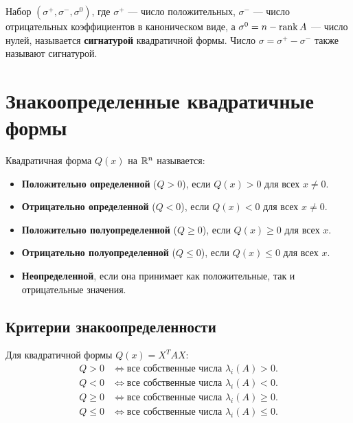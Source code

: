 \documentclass[12pt]{article}
\begin{document}
\begin{definition}
Набор $(\sigma^+, \sigma^-, \sigma^0)$, где $\sigma^+$ --- число положительных, $\sigma^-$ --- число отрицательных коэффициентов в каноническом виде, а $\sigma^0 = n - \operatorname{rank} A$ --- число нулей, называется \textbf{сигнатурой} квадратичной формы. Число $\sigma = \sigma^+ - \sigma^-$ также называют сигнатурой.
\end{definition}

\section{Знакоопределенные квадратичные формы}

\begin{definition}
Квадратичная форма $Q(x)$ на $\mathbb{R}^n$ называется:
\begin{itemize}
    \item \textbf{Положительно определенной} ($Q > 0$), если $Q(x) > 0$ для всех $x \neq 0$.
    \item \textbf{Отрицательно определенной} ($Q < 0$), если $Q(x) < 0$ для всех $x \neq 0$.
    \item \textbf{Положительно полуопределенной} ($Q \ge 0$), если $Q(x) \ge 0$ для всех $x$.
    \item \textbf{Отрицательно полуопределенной} ($Q \le 0$), если $Q(x) \le 0$ для всех $x$.
    \item \textbf{Неопределенной}, если она принимает как положительные, так и отрицательные значения.
\end{itemize}
\end{definition}

\subsection{Критерии знакоопределенности}

\begin{theorem}
Для квадратичной формы $Q(x) = X^T A X$:
\begin{align*}
Q > 0 &\iff \text{все собственные числа } \lambda_i(A) > 0. \\
Q < 0 &\iff \text{все собственные числа } \lambda_i(A) < 0. \\
Q \ge 0 &\iff \text{все собственные числа } \lambda_i(A) \ge 0. \\
Q \le 0 &\iff \text{все собственные числа } \lambda_i(A) \le 0.
\end{align*}
\end{theorem}
\end{document}
